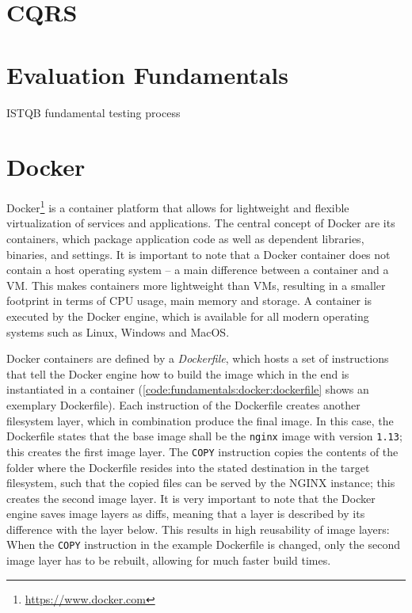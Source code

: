\section{CQRS}
\label{sec:fundamentals:CQRS}

\section{Evaluation Fundamentals}
\label{sec:fundamentals:evaluation}

ISTQB fundamental testing process~\cite{graham2008foundations}

\section{Docker}
\label{sec:fundamentals:docker}

Docker\footnote{\url{https://www.docker.com}} is a container platform that allows for lightweight and flexible virtualization of services and applications.
The central concept of Docker are its containers, which package application code as well as dependent libraries, binaries, and settings.
It is important to note that a Docker container does not contain a host operating system -- a main difference between a container and a \ac{VM}.
This makes containers more lightweight than \ac{VM}s, resulting in a smaller footprint in terms of CPU usage, main memory and storage.
A container is executed by the Docker engine, which is available for all modern operating systems such as Linux, Windows and MacOS.

Docker containers are defined by a \emph{Dockerfile}, which hosts a set of instructions that tell the Docker engine how to build the image which in the end is instantiated in a container (\cref{code:fundamentals:docker:dockerfile} shows an exemplary Dockerfile).
Each instruction of the Dockerfile creates another filesystem layer, which in combination produce the final image.
In this case, the Dockerfile states that the base image shall be the \texttt{nginx} image with version \texttt{1.13}; this creates the first image layer.
The \texttt{COPY} instruction copies the contents of the folder where the Dockerfile resides into the stated destination in the target filesystem, such that the copied files can be served by the NGINX instance; this creates the second image layer.
It is very important to note that the Docker engine saves image layers as diffs, meaning that a layer is described by its  difference with the layer below.
This results in high reusability of image layers: When the \texttt{COPY} instruction in the example Dockerfile is changed, only the second image layer has to be rebuilt, allowing for much faster build times.

